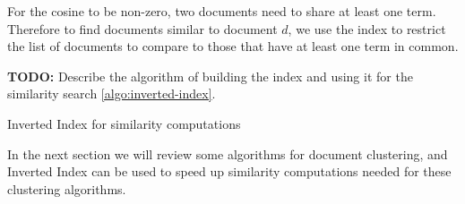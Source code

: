For the cosine to be non-zero, two documents need to share at least one term.
Therefore to find documents similar to document $d$, we use the index to
restrict the list of documents to compare to those that
have at least one term in common.

\textbf{TODO: }Describe the algorithm of building the index and using it for the 
similarity search \ref{algo:inverted-index}.

\begin{algorithm}
\caption{Inverted Index for similarity computations}
\label{algo:inverted-index}
\begin{algorithmic}[0]
  \Statex
    \EndFor
      \EndFor
    \EndFor
    \State {}
  \EndFunction
\end{algorithmic}

\begin{algorithmic}[0]
  \Statex
       
    \EndFor
    \State {}
  \EndFunction
\end{algorithmic}
\end{algorithm}


In the next section we will review some algorithms for document clustering,
and Inverted Index can be used to speed up similarity computations
needed for these clustering algorithms. 